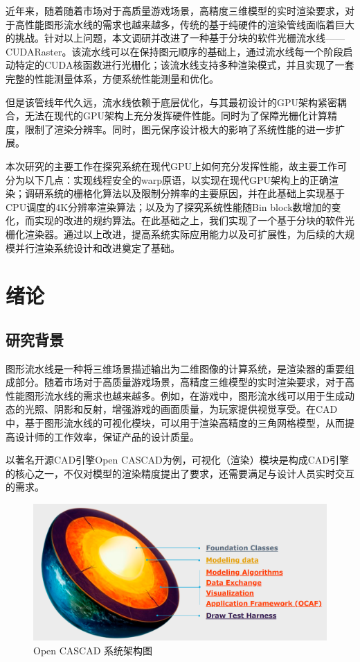 \documentclass{rjthesis}
\begin{document}
	
	\rjmaketitle
	\begin{rjabstract}
		近年来，随着随着市场对于高质量游戏场景，高精度三维模型的实时渲染要求，对于高性能图形流水线的需求也越来越多，传统的基于纯硬件的渲染管线面临着巨大的挑战。针对以上问题，本文调研并改进了一种基于分块的软件光栅流水线——CUDARaster。该流水线可以在保持图元顺序的基础上，通过流水线每一个阶段启动特定的CUDA核函数进行光栅化；该流水线支持多种渲染模式，并且实现了一套完整的性能测量体系，方便系统性能测量和优化。
  
  但是该管线年代久远，流水线依赖于底层优化，与其最初设计的GPU架构紧密耦合，无法在现代的GPU架构上充分发挥硬件性能。同时为了保障光栅化计算精度，限制了渲染分辨率。同时，图元保序设计极大的影响了系统性能的进一步扩展。
  
  本次研究的主要工作在探究系统在现代GPU上如何充分发挥性能，故主要工作可分为以下几点：实现线程安全的warp原语，以实现在现代GPU架构上的正确渲染；调研系统的栅格化算法以及限制分辨率的主要原因，并在此基础上实现基于CPU调度的4K分辨率渲染算法；以及为了探究系统性能随Bin block数增加的变化，而实现的改进的规约算法。在此基础之上，我们实现了一个基于分块的软件光栅化渲染器。通过以上改进，提高系统实际应用能力以及可扩展性，为后续的大规模并行渲染系统设计和改进奠定了基础。

	\end{rjabstract}

	\section{绪论}

\subsection{研究背景}
图形流水线是一种将三维场景描述输出为二维图像的计算系统，是渲染器的重要组成部分。随着市场对于高质量游戏场景，高精度三维模型的实时渲染要求，对于高性能图形流水线的需求也越来越多。例如，在游戏中，图形流水线可以用于生成动态的光照、阴影和反射，增强游戏的画面质量，为玩家提供视觉享受。在CAD中，基于图形流水线的可视化模块，可以用于渲染高精度的三角网格模型，从而提高设计师的工作效率，保证产品的设计质量。

以著名开源CAD引擎Open CASCAD\cite{opencascad}为例，可视化（渲染）模块是构成CAD引擎的核心之一，不仅对模型的渲染精度提出了要求，还需要满足与设计人员实时交互的需求\cite{cad2023,tvcg18}。

\begin{figure}[tbph]
	\centering
	\includegraphics[width=0.8\linewidth]{figures/opencascad}
	\caption[Open CASCAD 系统架构图]{Open CASCAD 系统架构图\cite{opencascad}}
	\label{fig:opencascad}
\end{figure}

	
\end{document}
